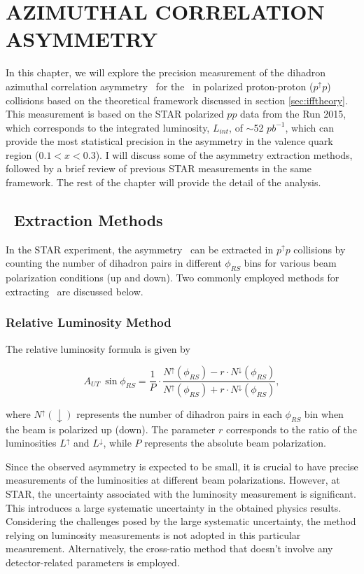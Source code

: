 \chapter{\pip AZIMUTHAL CORRELATION ASYMMETRY}
\label{chapter:iff}
In this chapter, we will explore the precision measurement of the dihadron azimuthal correlation asymmetry \aut\ for the \pip\ in polarized proton-proton ($p^\uparrow p$) collisions based on the theoretical framework discussed in section \ref{sec:ifftheory}. This measurement is based on the STAR polarized $pp$ data from the Run 2015, which corresponds to the integrated luminosity, $L_{int}$, of $\sim $52 $pb^{-1}$, which can provide the most statistical precision in the asymmetry  in the valence quark region ($0.1<x<0.3$). I will discuss some of the asymmetry extraction methods, followed by a brief review of previous STAR measurements in the same framework. The rest of the chapter will provide the detail of the analysis. 

\section{\aut\ Extraction Methods}
In the STAR experiment, the asymmetry \aut\ can be extracted in $p^\uparrow p$ collisions by counting the number of dihadron pairs in different $\phi_{RS}$ bins for various beam polarization conditions (up and down). Two commonly employed methods for extracting \aut\ are discussed below.   
\subsection{Relative Luminosity Method}
The relative luminosity formula is given by

\begin{equation}
A_{UT}\ \sin \phi_{RS} = \frac{1}{P} \cdot \frac{N^\uparrow (\phi_{RS}) - r \cdot N^\downarrow (\phi_{RS})}{N^\uparrow (\phi_{RS}) + r \cdot N^\downarrow (\phi_{RS})},
\end{equation}

where $N^\uparrow (\downarrow)$ represents the number of dihadron pairs in each $\phi_{RS}$ bin when the beam is polarized up (down). The parameter $r$ corresponds to the ratio of the luminosities $L^\uparrow$ and $L^\downarrow$, while $P$ represents the absolute beam polarization.

Since the observed asymmetry is expected to be small, it is crucial to have precise measurements of the luminosities at different beam polarizations. However, at STAR, the uncertainty associated with the luminosity measurement is significant. This introduces a large systematic uncertainty in the obtained physics results. Considering the challenges posed by the large systematic uncertainty, the method relying on luminosity measurements is not adopted in this particular measurement. Alternatively, the cross-ratio method that doesn't involve any detector-related parameters is employed.

